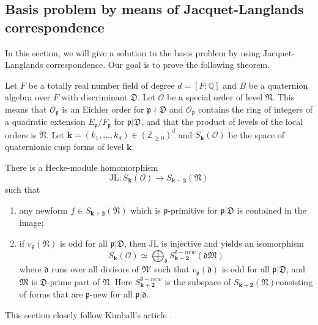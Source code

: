 \subsection{Basis problem by means of Jacquet-Langlands correspondence}
In this section, we will give a solution to the basis problem by using Jacquet-Langlands correspondence.
Our goal is to prove the following theorem.
\begin{theorem}
    Let $F$ be a totally real number field of degree $d = [F:\mathbb{Q}]$ and $B$ be a quaternion algebra over $F$ with discriminant $\mathfrak{D}$.
    Let $\mathcal{O}$ be a special order of level $\mathfrak{N}$.
    This means that $\mathcal{O}_{\mathfrak{p}}$ is an Eichler order for $\mathfrak{p}\nmid \mathfrak{D}$
    and $\mathcal{O}_{\mathfrak{p}}$ contains the ring of integers of a quadratic extension
    $E_{\mathfrak{p}} / F_{\mathfrak{p}}$ for $\mathfrak{p} | \mathfrak{D}$, 
    and that the product of levels of the local orders is $\mathfrak{N}$.
    Let $\mathbf{k} = (k_{1}, \dots, k_{d}) \in (\mathbb{Z}_{\geq 0})^{d}$ and $S_{\mathbf{k}}(\mathcal{O})$
    be the space of quaternionic cusp forms of level $\mathbf{k}$.

    There is a Hecke-module homomorphism 
    $$\mathrm{JL}: S_{\mathbf{k}}(\mathcal{O}) \to S_{\mathbf{k} + \mathbf{2}}(\mathfrak{N})$$
    such that 
    \begin{enumerate}
        \item any newform $f \in S_{\mathbf{k} + \mathbf{2}}(\mathfrak{N})$ which is $\mathfrak{p}$-primitive 
        for $\mathfrak{p}|\mathfrak{D}$ is contained in the image;
        \item if $v_{\mathfrak{p}}(\mathfrak{N})$ is odd for all $\mathfrak{p}|\mathfrak{D}$,
        then $\mathrm{JL}$ is injective and yields an isomorphism
        $$
            S_{\mathbf{k}}(\mathcal{O}) \simeq \bigoplus_{\mathfrak{d}} S_{\mathbf{k} + \mathbf{2}}^{\mathfrak{d}- new}(\mathfrak{dM})
        $$
        where $\mathfrak{d}$ runs over all divisors of $\mathfrak{N}'$ such that $v_{\mathfrak{p}}(\mathfrak{d})$ 
        is odd for all $\mathfrak{p} | \mathfrak{D}$, and $\mathfrak{M}$ is $\mathfrak{D}$-prime part of $\mathfrak{N}$.
        Here $S_{\mathbf{k} + \mathbf{2}}^{\mathfrak{d}-new}$ is the subspace of $S_{\mathbf{k} + \mathbf{2}}(\mathfrak{N})$consisting of forms that are $\mathfrak{p}$-new
        for all $\mathfrak{p} | \mathfrak{d}$.
    \end{enumerate}

\end{theorem}
This section closely follow Kimball's article \cite{martin2020basis}.